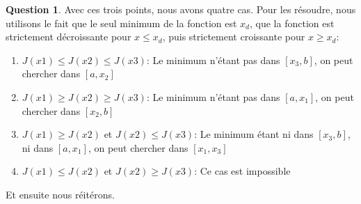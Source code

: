 \documentclass[a4paper]{article}
\theoremstyle{definition}
\newtheorem{que}{Question}
\begin{document}
	\setcounter{que}{12}
	\begin{que}
		Avec ces trois points, nous avons quatre cas. Pour les résoudre, nous utilisons le fait que le seul minimum de la fonction est $x_d$, que la fonction est strictement décroissante pour $x \leq x_d$, puis strictement croissante pour $x \geq x_d$: \\
		\begin{enumerate}
			\item $J(x1) \leq J(x2) \leq J(x3)$: Le minimum n'étant pas dans $[x_3, b]$, on peut chercher dans $[a, x_2]$
			\item $J(x1) \geq J(x2) \geq J(x3)$:  Le minimum n'étant pas dans $[a, x_1]$, on peut chercher dans $[x_2, b]$
			\item $J(x1) \geq J(x2)$ et $J(x2) \leq J(x3)$: Le minimum étant ni dans $[x_3, b]$, ni dans $[a, x_1]$, on peut chercher dans $[x_1, x_3]$
			\item $J(x1) \leq J(x2)$ et $J(x2) \geq J(x3)$: Ce cas est impossible
		\end{enumerate}
		Et ensuite nous réitérons.
	\end{que}
\end{document}
